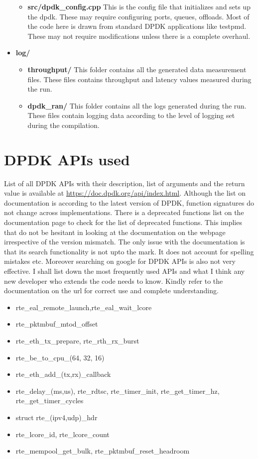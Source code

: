 \documentclass{article}
\begin{document}
\begin{itemize}
\begin{itemize}
    \item \textbf{src/dpdk\_config.cpp}
          This is the config file that initializes and sets up the dpdk. These may require configuring ports, queues, offloads. Most of the code here is drawn from standard DPDK applications like testpmd. These may not require modifications unless there is a complete overhaul.
        \end{itemize}
    \item \textbf{log/}
    \begin{itemize}
        \item \textbf{throughput/} This folder contains all the generated data measurement files. These files contains throughput and latency values measured during the run.
        \item \textbf{dpdk\_ran/} This folder contains all the logs generated during the run. These files contain logging data according to the level of logging set during the compilation. 
    \end{itemize}
\end{itemize}
\section{DPDK APIs used}
List of all DPDK APIs with their description, list of arguments and the return value is available at \url{https://doc.dpdk.org/api/index.html}. Although the list on documentation is according to the latest version of DPDK, function signatures do not change across implementations. There is a deprecated functions list on the documentation page to check for the list of deprecated functions. This implies that do not be hesitant in looking at the documentation on the webpage irrespective of the version mismatch. The only issue with the documentation is that its search functionality is not upto the mark. It does not account for spelling mistakes etc. Moreover searching on google for DPDK APIs is also not very effective.
I shall list down the most frequently used APIs and what I think any new developer who extends the code needs to know. Kindly refer to  the documentation on the url for correct use and complete understanding.
\begin{itemize}
    \item rte\_eal\_remote\_launch,rte\_eal\_wait\_lcore
    \item rte\_pktmbuf\_mtod\_offset
    \item rte\_eth\_tx\_prepare, rte\_rth\_rx\_burst
    \item rte\_be\_to\_cpu\_(64, 32, 16)
    \item rte\_eth\_add\_(tx,rx)\_callback
    \item rte\_delay\_(ms,us), rte\_rdtsc, rte\_timer\_init, rte\_get\_timer\_hz, rte\_get\_timer\_cycles
    \item struct rte\_(ipv4,udp)\_hdr
    \item rte\_lcore\_id, rte\_lcore\_count
    \item rte\_mempool\_get\_bulk, rte\_pktmbuf\_reset\_headroom
\end{itemize}
\end{document}
